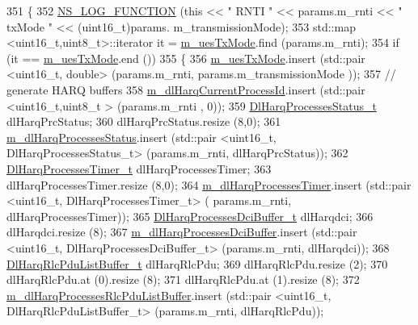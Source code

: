 \begin{DoxyCode}
351 \{
352   \hyperlink{log-macros-disabled_8h_a90b90d5bad1f39cb1b64923ea94c0761}{NS\_LOG\_FUNCTION} (\textcolor{keyword}{this} << \textcolor{stringliteral}{" RNTI "} << params.m\_rnti << \textcolor{stringliteral}{" txMode "} << (uint16\_t)params.
      m\_transmissionMode);
353   std::map <uint16\_t,uint8\_t>::iterator it = \hyperlink{classns3_1_1FdTbfqFfMacScheduler_a08550374df1be10395aa320fc1722066}{m\_uesTxMode}.find (params.m\_rnti);
354   \textcolor{keywordflow}{if} (it == \hyperlink{classns3_1_1FdTbfqFfMacScheduler_a08550374df1be10395aa320fc1722066}{m\_uesTxMode}.end ())
355     \{
356       \hyperlink{classns3_1_1FdTbfqFfMacScheduler_a08550374df1be10395aa320fc1722066}{m\_uesTxMode}.insert (std::pair <uint16\_t, double> (params.m\_rnti, params.m\_transmissionMode
      ));
357       \textcolor{comment}{// generate HARQ buffers}
358       \hyperlink{classns3_1_1FdTbfqFfMacScheduler_a62be9c7aa20ef5d6994f9aa927f73858}{m\_dlHarqCurrentProcessId}.insert (std::pair <uint16\_t,uint8\_t > (params.m\_rnti
      , 0));
359       \hyperlink{namespacens3_a457b3571b67ff17d042e9894e90e2ce2}{DlHarqProcessesStatus\_t} dlHarqPrcStatus;
360       dlHarqPrcStatus.resize (8,0);
361       \hyperlink{classns3_1_1FdTbfqFfMacScheduler_abc7e2984f379ab5a1855d815c439fa4f}{m\_dlHarqProcessesStatus}.insert (std::pair <uint16\_t, DlHarqProcessesStatus\_t> 
      (params.m\_rnti, dlHarqPrcStatus));
362       \hyperlink{namespacens3_a39413ade536de4b1c82d6c0074cc703e}{DlHarqProcessesTimer\_t} dlHarqProcessesTimer;
363       dlHarqProcessesTimer.resize (8,0);
364       \hyperlink{classns3_1_1FdTbfqFfMacScheduler_ae7a4cdc82a971f39b2238c472ceedf62}{m\_dlHarqProcessesTimer}.insert (std::pair <uint16\_t, DlHarqProcessesTimer\_t> (
      params.m\_rnti, dlHarqProcessesTimer));
365       \hyperlink{namespacens3_af25599bf8f9f564075c005759c9af18c}{DlHarqProcessesDciBuffer\_t} dlHarqdci;
366       dlHarqdci.resize (8);
367       \hyperlink{classns3_1_1FdTbfqFfMacScheduler_a3b740ad89004ff0fce4d87eea57508e5}{m\_dlHarqProcessesDciBuffer}.insert (std::pair <uint16\_t,
       DlHarqProcessesDciBuffer\_t> (params.m\_rnti, dlHarqdci));
368       \hyperlink{namespacens3_a4c0cbd1e72f1c667f8b5879655f13210}{DlHarqRlcPduListBuffer\_t} dlHarqRlcPdu;
369       dlHarqRlcPdu.resize (2);
370       dlHarqRlcPdu.at (0).resize (8);
371       dlHarqRlcPdu.at (1).resize (8);
372       \hyperlink{classns3_1_1FdTbfqFfMacScheduler_ac885f8c49550f861905b5e790e346d7b}{m\_dlHarqProcessesRlcPduListBuffer}.insert (std::pair <uint16\_t,
       DlHarqRlcPduListBuffer\_t> (params.m\_rnti, dlHarqRlcPdu));

\end{DoxyCode}
